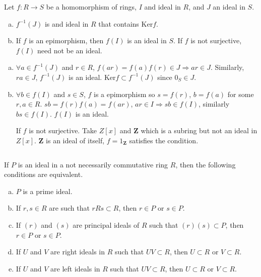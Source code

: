 $$ $$

\begin{ex}
    Let $f:R\to S$ be a homomorphism of rings, $I$ and ideal in $R$, and $J$ an ideal in $S$.
    \begin{enumerate}[(a)]
        \item $f^{-1}(J)$ is and ideal in $R$ that contains $\mathrm{Ker}f$.
        \item If $f$ is an epimorphism, then $f(I)$ is an ideal in $S$. If $f$ is not surjective, $f(I)$ need not be an ideal.
    \end{enumerate}
\end{ex}

\begin{answer}
    \begin{enumerate}[(a)]
        \item $\forall a\in f^{-1}(J)$ and $r\in R$, $f(ar)=f(a)f(r)\in J\Rightarrow ar\in J$. Similarly, $ra\in J$, $f^{-1}(J)$ is an ideal. $\mathrm{Ker}f\subset f^{-1}(J)$ since $0_{S}\in J$.
        \item $\forall b\in f(I)$ and $s\in S$, $f$ is a epimorphism so $s=f(r)$, $b=f(a)$ for some $r, a\in R$. $sb=f(r)f(a)=f(ar)$, $ar\in I\Rightarrow sb\in f(I)$, similarly $bs\in f(I)$. $f(I)$ is an ideal.
        
        If $f$ is not surjective. Take $Z\left[x\right]$ and $\mathbf{Z}$ which is a subring but not an ideal in $Z\left[x\right]$. $\mathbf{Z}$ is an ideal of itself, $f=1_{\mathbf{Z}}$ satisfies the condition.
    \end{enumerate}
\end{answer}

$$ $$

\begin{ex}
    If $P$ is an ideal in a not necessarily commutative ring $R$, then the following conditions are equivalent.
    \begin{enumerate}[(a)]
        \item $P$ is a prime ideal.
        \item If $r,s\in R$ are such that $rRs\subset R$, then $r\in P$ or $s\in P$.
        \item If $(r)$ and $(s)$ are principal ideals of $R$ such that $(r)(s)\subset P$, then $r\in P$ or $s\in P$.
        \item If $U$ and $V$ are right ideals in $R$ such that $UV\subset R$, then $U\subset R$ or $V\subset R$.
        \item If $U$ and $V$ are left ideals in $R$ such that $UV\subset R$, then $U\subset R$ or $V\subset R$.
    \end{enumerate}
\end{ex}

